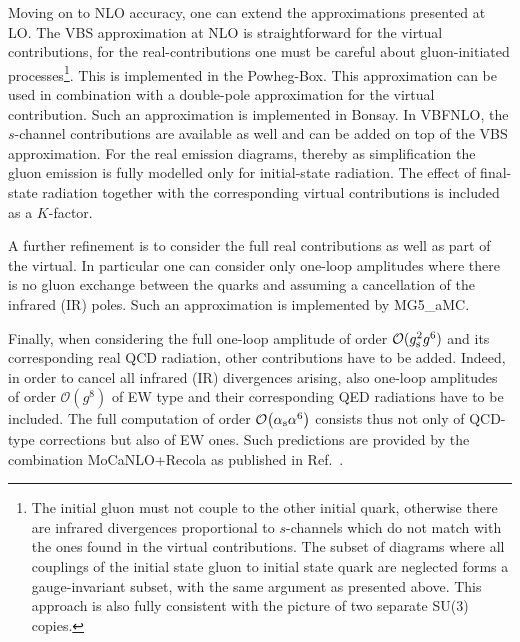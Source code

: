 Moving on to NLO accuracy, one can extend the approximations presented at LO.
The VBS approximation at NLO is straightforward for the virtual contributions, for the real-contributions one must be careful about gluon-initiated processes\footnote{The initial gluon must not couple to the other initial quark, otherwise there are infrared divergences proportional to $s$-channels which do not match with the ones found in the virtual contributions.
The subset of diagrams where all couplings of the initial state gluon to initial state quark are neglected forms a gauge-invariant subset, with the same argument as presented above. This approach is also fully consistent with the picture of two separate SU(3) copies.
}.
This is implemented in the {\sc Powheg-Box}.
This approximation can be used in combination with a double-pole approximation \cite{Dittmaier:2015bfe} for the virtual contribution.
Such an approximation is implemented in {\sc Bonsay}.
In {\sc VBFNLO}, the $s$-channel contributions are available as well and can be
added on top of the VBS approximation. For the real emission diagrams, thereby
as simplification the gluon emission is fully modelled only for initial-state
radiation. The effect of final-state radiation together with the corresponding
virtual contributions is included as a $K$-factor. 

A further refinement is to consider the full real contributions as well as part of the virtual.
In particular one can consider only one-loop amplitudes where there is no gluon exchange between the quarks and 
assuming a cancellation of the infrared (IR) poles.
Such an approximation is implemented by {\sc MG5\_aMC}.

Finally, when considering the full one-loop amplitude of order $\mathcal{O}(g_{\rm s}^2 g^6)$ and its corresponding real QCD radiation, other contributions have to be added.
Indeed, in order to cancel all infrared (IR) divergences arising, also one-loop amplitudes of order $\mathcal{O}(g^8)$ of EW type and their corresponding QED radiations have to be included.
The full computation of order $\mathcal{O}{\left(\alpha_\text{s} \alpha^{6}\right)}$ consists thus not only of QCD-type corrections but also of EW ones. 
Such predictions are provided by the combination {\sc MoCaNLO+Recola} as published in Ref.~\cite{Biedermann:2017bss}.

